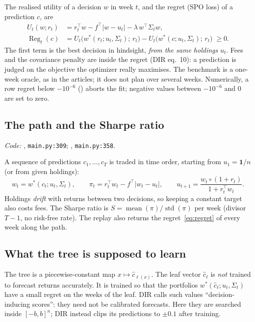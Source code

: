 \documentclass[11pt,a4paper]{article}
\DeclareMathOperator{\Reg}{Reg}
\newcommand{\1}{\mathbf{1}}
\newcommand{\code}[1]{\texttt{\detokenize{#1}}}
\begin{document}
The realised utility of a decision $w$ in week $t$, and the regret (SPO loss) of a prediction $c$, are
\begin{align}
U_t(w;r_t)&=r_t^\top w-f^\top|w-u_t|-\lambda\,w^\top\Sigma_t w, \label{eq:utility}\\
\Reg_t(c)&=U_t\big(w^\ast(r_t;u_t,\Sigma_t);\,r_t\big)-U_t\big(w^\ast(c;u_t,\Sigma_t);\,r_t\big)\;\ge 0. \label{eq:regret}
\end{align}
The first term is the best decision in hindsight, \emph{from the same holdings} $u_t$. Fees and the covariance penalty are inside the regret (DIR eq.~10): a prediction is judged on the objective the optimizer really maximises. The benchmark is a one-week oracle, as in the articles; it does not plan over several weeks. Numerically, a row regret below $-10^{-6}$ (\code{regret_tolerance}) aborts the fit; negative values between $-10^{-6}$ and 0 are set to zero.

\subsection{The path and the Sharpe ratio}
{\small\emph{Code:} \code{replay_path}, \texttt{main.py:309}; \code{_trade}, \texttt{main.py:358}.}

A sequence of predictions $c_1,\dots,c_T$ is traded in time order, starting from $u_1=\1/n$ (or from given holdings):
\begin{equation}
w_t=w^\ast(c_t;u_t,\Sigma_t),\qquad
\pi_t=r_t^\top w_t-f^\top|w_t-u_t|,\qquad
u_{t+1}=\frac{w_t\circ(1+r_t)}{1+r_t^\top w_t}.
\label{eq:path}
\end{equation}
Holdings \emph{drift} with returns between two decisions, so keeping a constant target also costs fees. The Sharpe ratio is $S=\operatorname{mean}(\pi)/\operatorname{std}(\pi)$ per week (divisor $T-1$, no risk-free rate). The replay also returns the regret~\eqref{eq:regret} of every week along the path.

\subsection{What the tree is supposed to learn}
The tree is a piecewise-constant map $x\mapsto\hat c_{\ell(x)}$. The leaf vector $\hat c_\ell$ is \emph{not} trained to forecast returns accurately. It is trained so that the portfolios $w^\ast(\hat c_\ell;u_t,\Sigma_t)$ have a small regret on the weeks of the leaf. DIR calls such values ``decision-inducing scores'': they need not be calibrated forecasts. Here they are searched inside $[-b,b]^n$; DIR instead clips its predictions to $\pm0.1$ after training.
\end{document}
